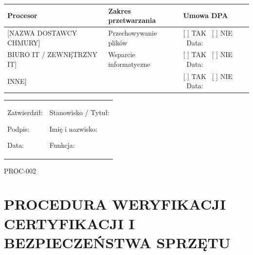 \documentclass[12pt,a4paper]{article}
\begin{document}
\begin{longtable}[]{@{}>{\raggedright\arraybackslash}p{}>{\raggedright\arraybackslash}p{}>{\raggedright\arraybackslash}p{}@{}}
\toprule\noalign{}
Procesor & Zakres przetwarzania & Umowa DPA \\
\midrule\noalign{}
\endhead
\bottomrule\noalign{}
\endlastfoot
{[}NAZWA DOSTAWCY CHMURY{]} & Przechowywanie plików & {[} {]} TAK ~{[}
{]} NIE ~Data: \underline{\hspace{2cm}} \\
{[}BIURO IT / ZEWNĘTRZNY IT{]} & Wsparcie informatyczne & {[} {]} TAK
~{[} {]} NIE ~Data: \underline{\hspace{2cm}} \\
{[}INNE{]} & \underline{\hspace{3cm}} & {[} {]} TAK ~{[}
{]} NIE ~Data: \underline{\hspace{2cm}} \\
\end{longtable}

\begin{longtable}[]{@{}
  >{\raggedright\arraybackslash}p{}
  >{\raggedright\arraybackslash}p{}@{}}
\toprule\noalign{}
\endhead
\bottomrule\noalign{}
\endlastfoot
\begin{minipage}[t]{\linewidth}\raggedright
Zatwierdził:

Podpis: \underline{\hspace{3cm}}

Data: \underline{\hspace{4cm}}
\end{minipage} & \begin{minipage}[t]{\linewidth}\raggedright
Stanowisko / Tytuł:

Imię i nazwisko: \underline{\hspace{3cm}}

Funkcja: \underline{\hspace{3cm}}
\end{minipage} \\
\end{longtable}

\label{doc2}
PROC-002

\section{PROCEDURA WERYFIKACJI CERTYFIKACJI I BEZPIECZEŃSTWA
SPRZĘTU}\label{procedura-weryfikacji-certyfikacji-i-bezpieczeux144stwa-sprzux119tu}
\end{document}
